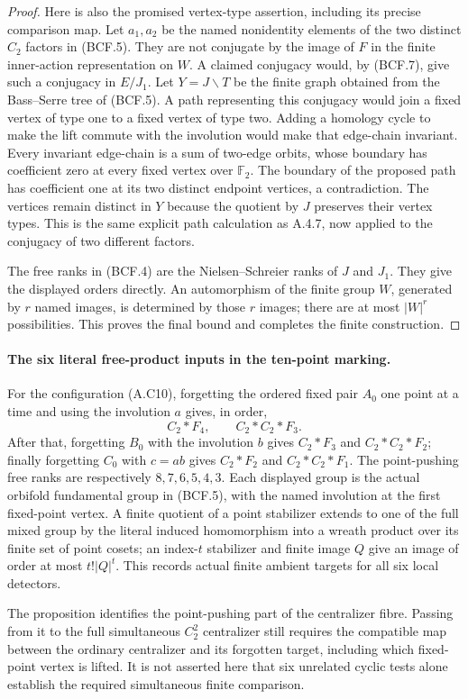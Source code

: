 \begin{proof}
Here is also the promised vertex-type assertion, including
its precise comparison map.  Let $a_1,a_2$ be the named
nonidentity elements of the two distinct $C_2$ factors
in (BCF.5).  They are not conjugate by the image of $F$
in the finite inner-action representation on $W$.
A claimed conjugacy would, by (BCF.7), give such a
conjugacy in $E/J_1$.  Let $Y=J\backslash T$ be the
finite graph obtained from the Bass--Serre tree of (BCF.5).
A path representing this conjugacy would join a fixed
vertex of type one to a fixed vertex of type two.  Adding
a homology cycle to make the lift commute with the
involution would make that edge-chain invariant.  Every
invariant edge-chain is a sum of two-edge orbits, whose
boundary has coefficient zero at every fixed vertex over
$\mathbb F_2$.  The boundary of the proposed path has
coefficient one at its two distinct endpoint vertices,
a contradiction.  The vertices remain distinct in $Y$
because the quotient by $J$ preserves their vertex types.
This is the same explicit path calculation as A.4.7,
now applied to the conjugacy of two different factors.

The free ranks in (BCF.4) are the Nielsen--Schreier ranks
of $J$ and $J_1$.  They give the displayed orders directly.
An automorphism of the finite group $W$, generated by
$r$ named images, is determined by those $r$ images;
there are at most $|W|^r$ possibilities.  This proves
the final bound and completes the finite construction.
\end{proof}

\paragraph{The six literal free-product inputs in the ten-point marking.}
For the configuration (A.C10), forgetting the ordered fixed
pair $A_0$ one point at a time and using the involution $a$
gives, in order,
\[
 C_2*F_4,\qquad C_2*C_2*F_3.
\]
After that, forgetting $B_0$ with the involution $b$ gives
$C_2*F_3$ and $C_2*C_2*F_2$; finally forgetting $C_0$
with $c=ab$ gives $C_2*F_2$ and $C_2*C_2*F_1$.
The point-pushing free ranks are respectively $8,7,6,5,4,3$.
Each displayed group is the actual orbifold fundamental
group in (BCF.5), with the named involution at the first
fixed-point vertex.  A finite quotient of a point stabilizer
extends to one of the full mixed group by the literal
induced homomorphism into a wreath product over its finite
set of point cosets; an index-$t$ stabilizer and finite
image $Q$ give an image of order at most $t!|Q|^t$.
This records actual finite ambient targets for all six
local detectors.

The proposition identifies the point-pushing part of the
centralizer fibre.  Passing from it to the full simultaneous
$C_2^2$ centralizer still requires the compatible map between
the ordinary centralizer and its forgotten target, including
which fixed-point vertex is lifted.  It is not asserted
here that six unrelated cyclic tests alone establish the
required simultaneous finite comparison.
